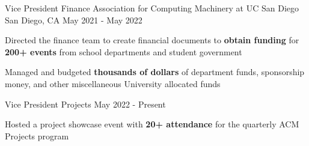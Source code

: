 \begin{cventries}

\cvtwoentry
{Vice President Finance}
{Association for Computing Machinery at UC San Diego}
{San Diego, CA}
{May 2021 - May 2022}
{
\begin{cvitems}
  \item Directed the finance team to create financial documents to \textbf{obtain funding} for \textbf{200+ events} from school departments and student government
  \item Managed and budgeted \textbf{thousands of dollars} of department funds, sponsorship money, and other miscellaneous University allocated funds
\end{cvitems}
}
{Vice President Projects}
{May 2022 - Present}
{
\begin{cvitems}
  \item Hosted a project showcase event with \textbf{20+ attendance} for the quarterly ACM Projects program 
\end{cvitems}
}

\end{cventries}